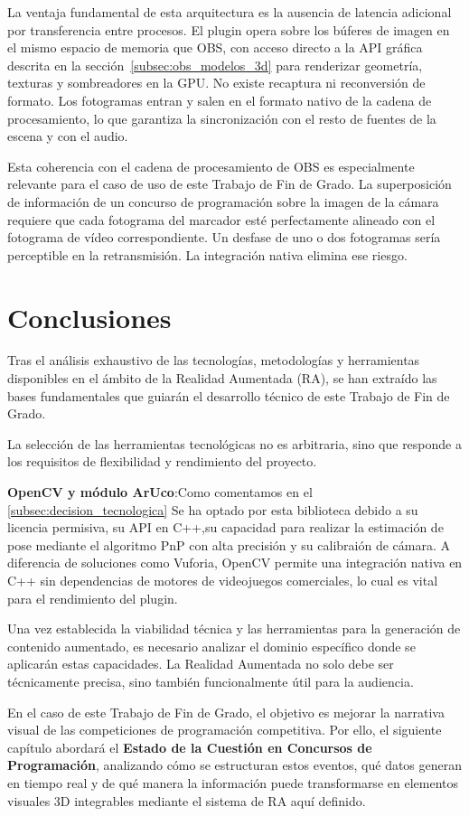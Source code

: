 La ventaja fundamental de esta arquitectura es la ausencia de latencia adicional por transferencia entre procesos. El plugin opera sobre los búferes de imagen en el mismo espacio de memoria que OBS, con acceso directo a la API gráfica descrita en la sección~\ref{subsec:obs_modelos_3d} para renderizar geometría, texturas y sombreadores en la GPU. No existe recaptura ni reconversión de formato. Los fotogramas entran y salen en el formato nativo de la cadena de procesamiento, lo que garantiza la sincronización con el resto de fuentes de la escena y con el audio.

Esta coherencia con el cadena de procesamiento de OBS es especialmente relevante para el caso de uso de este Trabajo de Fin de Grado. La superposición de información de un concurso de programación sobre la imagen de la cámara requiere que cada fotograma del marcador esté perfectamente alineado con el fotograma de vídeo correspondiente. Un desfase de uno o dos fotogramas sería perceptible en la retransmisión. La integración nativa elimina ese riesgo.

\section{Conclusiones}
\label{sec:conclusiones_ra}

Tras el análisis exhaustivo de las tecnologías, metodologías y herramientas disponibles en el ámbito de la Realidad Aumentada (RA), se han extraído las bases fundamentales que guiarán el desarrollo técnico de este Trabajo de Fin de Grado. 

La selección de las herramientas tecnológicas no es arbitraria, sino que responde a los requisitos de flexibilidad y rendimiento  del proyecto.

 \textbf{OpenCV y módulo ArUco}:Como comentamos en el \ref{subsec:decision_tecnologica} Se ha optado por esta biblioteca debido a su licencia permisiva, su API  en C++,su capacidad para realizar la estimación de pose mediante el algoritmo PnP con alta precisión y su calibraión de cámara. A diferencia de soluciones como Vuforia, OpenCV permite una integración nativa en C++ sin dependencias de motores de videojuegos comerciales, lo cual es vital para el rendimiento del plugin.

Una vez establecida la viabilidad técnica y las herramientas para la generación de contenido aumentado, es necesario analizar el dominio específico donde se aplicarán estas capacidades. La Realidad Aumentada no solo debe ser técnicamente precisa, sino también funcionalmente útil para la audiencia. 

En el caso de este Trabajo de Fin de Grado, el objetivo es mejorar la narrativa visual de las competiciones de programación competitiva. Por ello, el siguiente capítulo abordará el \textbf{Estado de la Cuestión en Concursos de Programación}, analizando cómo se estructuran estos eventos, qué datos generan en tiempo real y de qué manera la información puede transformarse en elementos visuales 3D integrables mediante el sistema de RA aquí definido.
